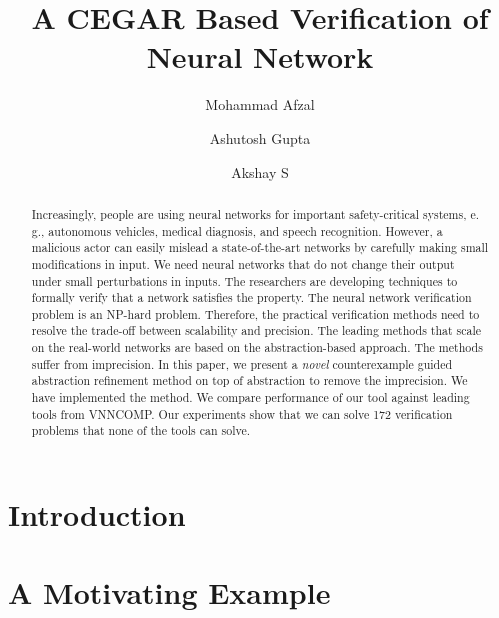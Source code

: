 \documentclass[10pt]{llncs}
\title{A CEGAR Based Verification of Neural Network}
\author{Mohammad Afzal\inst{1,2}\and Ashutosh Gupta\inst{1}\and Akshay S\inst{1}}
\institute{Indian Institute of Technology, Bombay, India\and TCS Research, Pune, India}
\begin{document}
\maketitle

\begin{abstract}
  Increasingly, people are using neural networks for important
  safety-critical systems, e. g., autonomous vehicles,
  medical diagnosis, and speech recognition.
  However, a malicious actor can easily
  mislead a state-of-the-art networks
  by carefully making small modifications in input.
  We need neural networks that do not change their output
  under small perturbations in inputs.
  The researchers are developing techniques to formally
  verify that a network satisfies the property.
  The neural network verification problem is an NP-hard problem.
  Therefore, the practical verification methods need to resolve the
  trade-off between scalability and precision.
  The leading methods that scale on the real-world
  networks are based on the abstraction-based approach.
  The methods suffer from imprecision.
  In this paper, %
  we present a {\em novel} counterexample guided abstraction
  refinement method on top of abstraction \deeppoly{} to remove
  the imprecision.  
  We have implemented the method.
  We compare performance of our tool against leading tools from VNNCOMP.
  Our experiments show that we can solve 172
  verification problems that none of the tools
  can solve.
\end{abstract}

\section{Introduction}
\label{sec:intro}



\section{A Motivating Example}
\label{sec:motivation}

\end{document}
